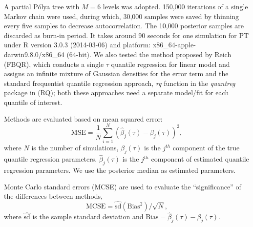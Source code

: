 \documentclass[12pt]{article}
\newcommand{\polya}{P\'{o}lya}
\begin{document}
A partial \polya{} tree with $M=6$ levels was adopted.
150,000 iterations of a single Markov chain were used,
during which, 30,000 samples were saved by thinning every five samples to decrease autocorrelation.
The 10,000 posterior samples are discarded as burn-in period.
It takes around 90 seconds for one simulation for PT under R version 3.0.3 (2014-03-06) and platform: x86\_64-apple-darwin9.8.0/x86\_64 (64-bit).
We also tested the method proposed by Reich (FBQR), which conducts a single $\tau$ quantile regression for linear model and assigns an infinite mixture of Gaussian densities for the error term and the standard frequentist quantile regression approach,
\textit{rq} function in the \textit{quantreg} package \citep{quantreg} in \cite{R} (RQ);
both these approaches need a separate model/fit for each quantile of interest.

Methods are evaluated based on mean squared error:
\begin{displaymath}
  \mbox{MSE}  =  \frac{1}{N}\sum_{i = 1}^N (\hat{\beta}_j(\tau) -
  \beta_j(\tau))^2 ,
\end{displaymath}
where $N$ is the number of simulations, $\beta_j(\tau)$ is the $j^{th}$ component of the true quantile regression parameters.
$\hat{\beta}_j(\tau)$ is the $j^{th}$ component of estimated quantile regression parameters.
We use the posterior median as estimated parameters.

Monte Carlo standard errors (MCSE) are used to evaluate the ``significance'' of the differences between methods,
\begin{displaymath}
  \mbox{MCSE} = \hat{\mbox{sd}}(\mbox{Bias}^2)/\sqrt{N},
\end{displaymath}
where $\hat{\mbox{sd}}$ is the sample standard deviation and $\mbox{Bias} = \hat{\beta}_{j}(\tau) - \beta_{j}(\tau)$.
\end{document}
